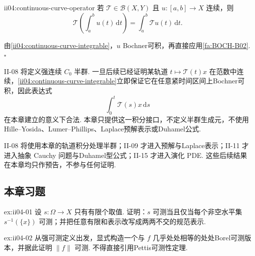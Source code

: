 \begin{FACorollary}[C][连续曲线与有界算子交换]{ii04:continuous-curve-operator}
若 \(\displaystyle\mathcal T\in\mathcal B(X,Y)\) 且 \(\displaystyle u:[a,b]\to X\) 连续，则
\[
\mathcal T\left(\int_a^bu(t)\,\mathrm{d}t\right)
=
\int_a^b\mathcal Tu(t)\,\mathrm{d}t.
\]
\end{FACorollary}

\begin{FAProof}
由\autoref{ii04:continuous-curve-integrable}，\(\displaystyle u\) Bochner可积，再直接应用\autoref{fa:BOCH-B02}.\hfill\(\square\)
\end{FAProof}

\begin{FAApplication}[未来的半群轨道积分接口]\label{ii04:semigroup-orbit-interface}
II-08 将定义强连续 \(\displaystyle C_0\) 半群. 一旦后续已经证明某轨道
\(\displaystyle t\longmapsto\mathcal T(t)x\)
在范数中连续，\autoref{ii04:continuous-curve-integrable}立即保证它在任意紧时间区间上Bochner可积，因此表达式
\[
\int_0^t\mathcal T(s)x\,\mathrm{d}s
\]
在本章建立的意义下合法. 本章只提供这一积分接口，不定义半群生成元，不使用Hille--Yosida、Lumer--Phillips、Laplace预解表示或Duhamel公式.
\end{FAApplication}

\begin{FARemark}[未来依赖边界]
II-08 将使用本章的轨道积分处理半群；II-09 才进入预解与Laplace表示；II-11 才进入抽象 Cauchy 问题与Duhamel型公式；II-15 才进入演化 PDE. 这些后续结果在本章均只作预告，不参与任何证明.
\end{FARemark}

\subsection*{本章习题}\label{sec:ii04-exercises}

\begin{FAExercise}[Banach值简单函数]{ex:ii04-01}
设 \(\displaystyle s:\Omega\to X\) 只有有限个取值. 证明：\(\displaystyle s\) 可测当且仅当每个非空水平集 \(\displaystyle s^{-1}(\{x\})\) 可测；并把任意有限和表示改写成两两不交的规范表示.
\end{FAExercise}

\begin{FAExercise}[强可测推出范数可测]{ex:ii04-02}
从强可测定义出发，显式构造一个与 \(\displaystyle f\) 几乎处处相等的处处Borel可测版本，并据此证明 \(\displaystyle\|f\|\) 可测. 不得直接引用Pettis可测性定理.
\end{FAExercise}

